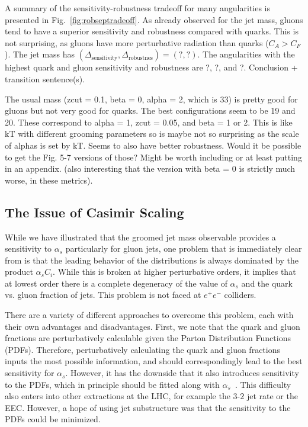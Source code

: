 A summary of the sensitivity-robustness tradeoff for many angularities
is presented in Fig.~\ref{fig:robseptradeoff}.  As already observed
for the jet mass, gluons tend to have a superior sensitivity and
robustness compared with quarks.  This is not surprising, as gluons
have more perturbative radiation than quarks ($C_A>C_F$).  The jet
mass has $(\Delta_\text{sensitivity},\Delta_\text{robustnes})=(?,?)$.
The angularities with the highest quark and gluon sensitivity and
robustness are ?, ?, and ?.   Conclusion + transition
sentence(s). 

The usual mass (zcut = 0.1, beta = 0, alpha = 2, which is 33) is pretty good for gluons but not very good for quarks.  The best configurations seem to be 19 and 20.  These correspond to alpha = 1, zcut = 0.05, and beta = 1 or 2.  This is like kT with different grooming parameters so is maybe not so surprising as the scale of alphas is set by kT.  Seems to also have better robustness.  Would it be possible to get the Fig. 5-7 versions of those?  Might be worth including or at least putting in an appendix.  (also interesting that the version with beta = 0 is strictly much worse, in these metrics).








\subsection{The Issue of Casimir Scaling}
\label{sec:casimir}



While we have illustrated that the groomed jet mass observable provides a sensitivity to $\alpha_s$ particularly for gluon jets, one problem that is immediately clear from  is that the leading behavior of the distributions is always dominated by the product $\alpha_s C_i$. While this is broken at higher perturbative orders, it implies that at lowest order there is a complete degeneracy of the value of $\alpha_s$ and the quark vs. gluon fraction of jets. This problem is not faced at $e^+e^-$ colliders.

There are a variety of different approaches to overcome this problem, each with their own advantages and disadvantages. First, we note that the quark and gluon fractions are perturbatively calculable given the Parton Distribution Functions (PDFs). Therefore, perturbatively calculating the quark and gluon fractions inputs the most possible information, and should correspondingly lead to the best sensitivity for $\alpha_s$. However, it has the downside that it also introduces sensitivity to the PDFs, which in principle should be fitted along with $\alpha_s$~\cite{Accardi:2016ndt}. This difficulty also enters into other extractions at the LHC, for example the $3$-$2$ jet rate or the EEC. However, a hope of using jet substructure was that the sensitivity to the PDFs could be minimized.

